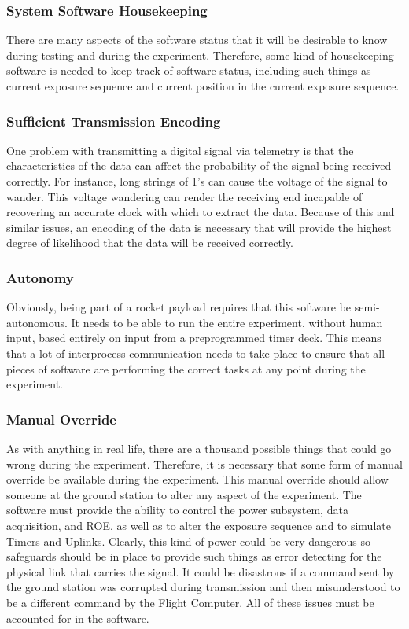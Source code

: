 \documentclass[11pt,titlepage]{article}
\begin{document}
\subsubsection{System Software Housekeeping}
There are many aspects of the software status that it will be desirable to know during testing and during the experiment. Therefore, some kind of 
housekeeping software is needed to keep track of software status, including such things as current exposure sequence and current position in the 
current exposure sequence. 

\subsubsection{Sufficient Transmission Encoding}
One problem with transmitting a digital signal via telemetry is that the characteristics of the data can affect the probability of the signal being
received correctly. For instance, long strings of 1's can cause the voltage of the signal to wander. This voltage wandering can render the receiving end 
incapable of recovering an accurate clock with which to extract the data. Because of this and similar issues, an encoding of the data is necessary that 
will provide the highest degree of likelihood that the data will be received correctly.

\subsubsection{Autonomy}
Obviously, being part of a rocket payload requires that this software be semi-autonomous. It needs to be able to run the entire experiment, without human
input, based entirely on input from a preprogrammed timer deck. This means that a lot of interprocess communication needs to take place to ensure that
all pieces of software are performing the correct tasks at any point during the experiment.

\subsubsection{Manual Override}

As with anything in real life, there are a thousand possible things that could go wrong during the experiment. Therefore, it is necessary that some form
of manual override be available during the experiment. This manual override should allow someone at the ground station to alter any aspect of the experiment.
The software must provide the ability to control the power subsystem, data acquisition, and ROE, as well as to alter the exposure sequence and to simulate 
Timers and Uplinks. Clearly, this kind of power could be very dangerous so safeguards should be in place to provide such things as error detecting for
the physical link that carries the signal. It could be disastrous if a command sent by the ground station was corrupted during transmission and then 
misunderstood to be a different command by the Flight Computer. All of these issues must be accounted for in the software.
\end{document}
